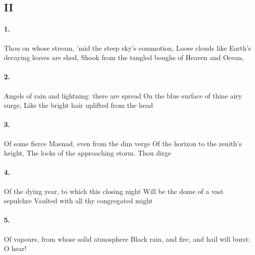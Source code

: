 \documentclass{doc}
\begin{document}
		\subsection{II}
			\paragraph{1.}
				Thou on whose stream, 'mid the steep sky's commotion, \newline
				Loose clouds like Earth's decaying leaves are shed, \newline
				Shook from the tangled boughs of Heaven and Ocean,
			\paragraph{2.}
				Angels of rain and lightning: there are spread \newline
				On the blue surface of thine airy surge, \newline
				Like the bright hair uplifted from the head
			\paragraph{3.}
				Of some fierce Maenad, even from the dim verge \newline
				Of the horizon to the zenith's height, \newline
				The locks of the approaching storm. Thou dirge
			\paragraph{4.}
				Of the dying year, to which this closing night \newline
				Will be the dome of a vast sepulchre \newline
				Vaulted with all thy congregated might
			\paragraph{5.}
				Of vapours, from whose solid atmosphere \newline
				Black rain, and fire, and hail will burst: O hear!
\end{document}
